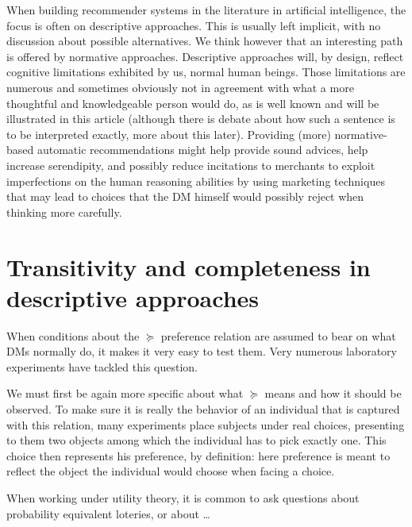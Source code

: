 \documentclass[french, english]{llncs}
\begin{document}
When building recommender systems in the literature in artificial intelligence, the focus is often on descriptive approaches. This is usually left implicit, with no discussion about possible alternatives. We think however that an interesting path is offered by normative approaches. Descriptive approaches will, by design, reflect cognitive limitations exhibited by us, normal human beings. Those limitations are numerous and sometimes obviously not in agreement with what a more thoughtful and knowledgeable person would do, as is well known and will be illustrated in this article (although there is debate about how such a sentence is to be interpreted exactly, more about this later). Providing (more) normative-based automatic recommendations might help provide sound advices, help increase serendipity, and possibly reduce incitations to merchants to exploit imperfections on the human reasoning abilities by using marketing techniques that may lead to choices that the \ac{DM} himself would possibly reject when thinking more carefully. 

\section{Transitivity and completeness in descriptive approaches}
When conditions about the $\succeq$ preference relation are assumed to bear on what \acp{DM} normally do, it makes it very easy to test them. Very numerous laboratory experiments have tackled this question.

We must first be again more specific about what $\succeq$ means and how it should be observed. To make sure it is really the behavior of an individual that is captured with this relation, many experiments place subjects under real choices, presenting to them two objects among which the individual has to pick exactly one. This choice then represents his preference, by definition: here preference is meant to reflect the object the individual would choose when facing a choice.

When working under utility theory, it is common to ask questions about probability equivalent loteries, or about …
\end{document}
